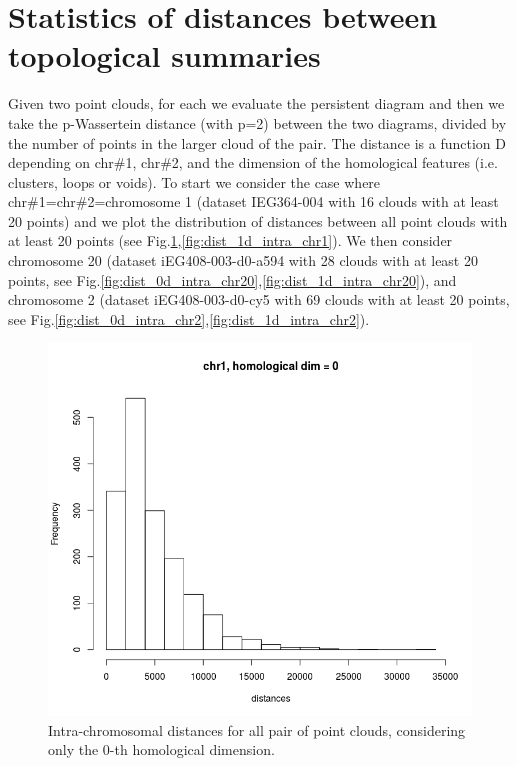 \documentclass[12pt,a4paper]{article}
\begin{document}
\section{Statistics of distances between topological summaries}
Given two point clouds, for each we evaluate the persistent diagram and then we take the p-Wassertein distance (with p=2) between the two diagrams, divided by the number of points in the larger cloud of the pair. The distance is a function D depending on chr\#1, chr\#2, and the dimension of the homological features (i.e. clusters, loops or voids). To start we consider the case where chr\#1=chr\#2=chromosome 1 (dataset IEG364-004 with 16 clouds with at least 20 points) and we plot the distribution of distances between all point clouds with at least 20 points (see Fig.\ref{fig:dist_0d_intra_chr1},\ref{fig:dist_1d_intra_chr1}). We then consider chromosome 20 (dataset iEG408-003-d0-a594 with 28 clouds with at least 20 points, 
see Fig.\ref{fig:dist_0d_intra_chr20},\ref{fig:dist_1d_intra_chr20}), and 
chromosome 2 (dataset iEG408-003-d0-cy5 with 69 clouds with at least 20 points, 
see Fig.\ref{fig:dist_0d_intra_chr2},\ref{fig:dist_1d_intra_chr2}).

\begin{figure}[hbtp]
\centering
\includegraphics[scale=0.75]{2wd_chr1_dim0_16clouds.png}
\caption{Intra-chromosomal distances for all pair of point clouds, considering only the 0-th homological dimension.}
\label{fig:dist_0d_intra_chr1}
\end{figure}
\end{document}
